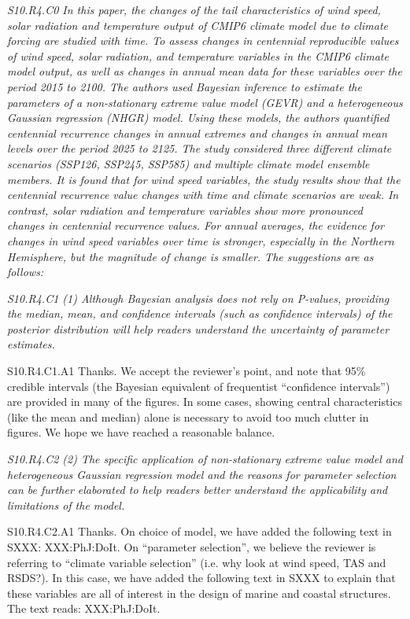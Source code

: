 \documentclass[a4paper,10pt]{article}
\begin{document}
	\emph{S10.R4.C0 In this paper, the changes of the tail characteristics of wind speed, solar radiation and temperature output of CMIP6 climate model due to climate forcing are studied with time. To assess changes in centennial reproducible values of wind speed, solar radiation, and temperature variables in the CMIP6 climate model output, as well as changes in annual mean data for these variables over the period 2015 to 2100. The authors used Bayesian inference to estimate the parameters of a non-stationary extreme value model (GEVR) and a heterogeneous Gaussian regression (NHGR) model. Using these models, the authors quantified centennial recurrence changes in annual extremes and changes in annual mean levels over the period 2025 to 2125. The study considered three different climate scenarios (SSP126, SSP245, SSP585) and multiple climate model ensemble members. It is found that for wind speed variables, the study results show that the centennial recurrence value changes with time and climate scenarios are weak. In contrast, solar radiation and temperature variables show more pronounced changes in centennial recurrence values. For annual averages, the evidence for changes in wind speed variables over time is stronger, especially in the Northern Hemisphere, but the magnitude of change is smaller. The suggestions are as follows:}

	\emph{S10.R4.C1 (1) Although Bayesian analysis does not rely on P-values, providing the median, mean, and confidence intervals (such as confidence intervals) of the posterior distribution will help readers understand the uncertainty of parameter estimates.}

	S10.R4.C1.A1 Thanks. We accept the reviewer's point, and note that 95\% credible intervals (the Bayesian equivalent of frequentist ``confidence intervals'') are provided in many of the figures. In some cases, showing central characteristics (like the mean and median) alone is necessary to avoid too much clutter in figures. We hope we have reached a reasonable balance.

	\emph{S10.R4.C2 (2) The specific application of non-stationary extreme value model and heterogeneous Gaussian regression model and the reasons for parameter selection can be further elaborated to help readers better understand the applicability and limitations of the model.}

	S10.R4.C2.A1 Thanks. On choice of model, we have added the following text in SXXX: XXX:PhJ:DoIt. On ``parameter selection'', we believe the reviewer is referring to ``climate variable selection'' (i.e. why look at wind speed, TAS and RSDS?). In this case, we have added the following text in SXXX to explain that these variables are all of interest in the design of marine and coastal structures. The text reads: XXX:PhJ:DoIt.
\end{document}
